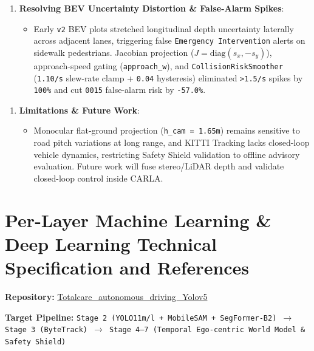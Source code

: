 \documentclass[10.5pt,a4paper]{article}
\begin{document}
\begin{enumerate}[leftmargin=1.8em,itemsep=2pt]
\item \textbf{Resolving BEV Uncertainty Distortion \& False-Alarm Spikes}:
\begin{itemize}[leftmargin=1.5em,itemsep=2pt]
\item Early \texttt{v2} BEV plots stretched longitudinal depth uncertainty laterally across adjacent lanes, triggering false \texttt{Emergency Intervention} alerts on sidewalk pedestrians. Jacobian projection ($J=\text{diag}(s_x,-s_y)$), approach-speed gating (\texttt{approach\_\allowbreak{}w}), and \texttt{CollisionRiskSmoother} (\texttt{1.\allowbreak{}10/\allowbreak{}s} slew-rate clamp + \texttt{0.\allowbreak{}04} hysteresis) eliminated \texttt{>1.\allowbreak{}5/\allowbreak{}s} spikes by \texttt{100\%} and cut \texttt{0015} false-alarm risk by \texttt{-\allowbreak{}57.\allowbreak{}0\%}.
\end{itemize}
\end{enumerate}

\begin{enumerate}[leftmargin=1.8em,itemsep=2pt]
\item \textbf{Limitations \& Future Work}:
\begin{itemize}[leftmargin=1.5em,itemsep=2pt]
\item Monocular flat-ground projection (\texttt{h\_\allowbreak{}cam = 1.\allowbreak{}65m}) remains sensitive to road pitch variations at long range, and KITTI Tracking lacks closed-loop vehicle dynamics, restricting Safety Shield validation to offline advisory evaluation. Future work will fuse stereo/LiDAR depth and validate closed-loop control inside CARLA.
\end{itemize}
\end{enumerate}
\newpage
\section{Per-Layer Machine Learning \& Deep Learning Technical Specification and References}

\textbf{Repository:} \href{https://github.com/Heisnotanimposter/Totalcare\_autonomous\_driving\_Yolov5}{Totalcare\_autonomous\_driving\_Yolov5}

\textbf{Target Pipeline:} \texttt{Stage 2 (YOLO11m/\allowbreak{}l + MobileSAM + SegFormer-\allowbreak{}B2) $\rightarrow$ Stage 3 (ByteTrack) $\rightarrow$ Stage 4--7 (Temporal Ego-\allowbreak{}centric World Model \& Safety Shield)}
\end{document}
